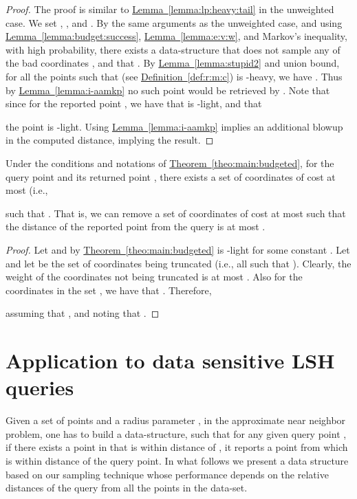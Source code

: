 \documentclass[12pt]{article}\usepackage[cm]{fullpage}
\theoremstyle{remark}\theoremheaderfont{\sf}\theorembodyfont{\upshape}\newtheorem{defn}[theorem]{Definition}
\numberwithin{figure}{section}\numberwithin{table}{section}\numberwithin{equation}{section}
\newcommand{\HLink}[2]{\hyperref[#2]{#1~\ref*{#2}}}
\newcommand{\HLinkPage}[2]{\hyperref[#2]{#1~\ref*{#2}}}
\newcommand{\seclab}[1]{\label{sec:#1}} \newcommand{\secref}[1]{\HLink{Section}{sec:#1}} \newcommand{\secrefpage}[1]{\HLinkPage{Section}{sec:#1}}
\newcommand{\defref}[1]{\HLink{Definition}{def:#1}}
\newcommand{\lemref}[1]{\HLink{Lemma}{lemma:#1}}
\newcommand{\thmref}[1]{\HLink{Theorem}{theo:#1}}
\begin{document}
\begin{proof}The proof is similar to \lemref{lp:heavy:tail} in the unweighted
    case. We set , , and
    . By the same arguments as the unweighted case, and
    using \lemref{budget:success}, \lemref{e:v:w}, and Markov's
    inequality, with high probability, there exists a data-structure
     that does not sample any of the bad coordinates
    , and that
    . By \lemref{stupid2} and
    union bound, for all the points  such that
     (see \defref{r:m:c}) is
    -heavy, we have
    . Thus by \lemref{i-aamkp} no such
    point would be retrieved by . Note that since for the
    reported point , we have that
     is -light,
    and that
    
    the point  is -light.  Using
    \lemref{i-aamkp} implies an additional  blowup in the
    computed distance, implying the result.
\end{proof}

\begin{corollary}
    Under the conditions and notations of \thmref{main:budgeted}, for
    the query point  and its returned point , there
    exists a set of coordinates  of cost
    at most  (i.e.,    
    
    such that .
    That is, we can remove a set of coordinates of cost at most 
    such that the distance of the reported point  from the query
     is at most .
\end{corollary}
\begin{proof}
    Let  and by \thmref{main:budgeted} 
    is -light for some constant . Let
     and let  be the set
    of coordinates being truncated (i.e., all  such that
    ). Clearly,
    the weight of the coordinates not being truncated is at most
    .
    Also for the coordinates in the set , we have that
    .  Therefore,
    
    assuming that , and noting that
    .
\end{proof}







\section{Application to data sensitive L{S}H queries}
\seclab{d:s:l}

Given a set of  points  and a radius parameter , in
the approximate near neighbor problem, one has to build a
data-structure, such that for any given query point , if there
exists a point in  that is within distance  of ,
it reports a point from  which is within distance
 of the query point. In what follows we present a data
structure based on our sampling technique whose performance depends on
the relative distances of the query from all the points in the
data-set.
\end{document}
